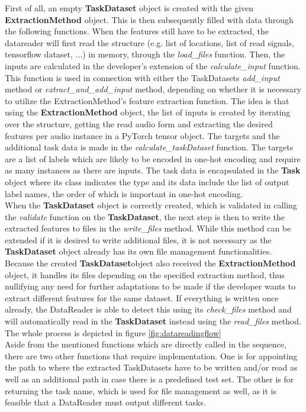 First of all, an empty \textbf{TaskDataset} object is created with the given \textbf{ExtractionMethod} object. This is then subsequently filled with data through the following functions. When the features still have to be extracted, the datareader will first read the structure (e.g. list of locations, list of read signals, tensorflow dataset, ...) in memory, through the \textit{load\_files} function. Then, the inputs are calculated in the developer's extension of the \textit{calculate\_input} function. This function is used in connection with either the TaskDatasets \textit{add\_input} method or \textit{extract\_and\_add\_input} method, depending on whether it is necessary to utilize the ExtractionMethod's feature extraction function. The idea is that using the \textbf{ExtractionMethod} object, the list of inputs is created by iterating over the structure, getting the read audio form and extracting the desired features per audio instance in a PyTorch tensor object. The targets and the additional task data is made in the \textit{calculate\_taskDataset} function. The targets are a list of labels which are likely to be encoded in one-hot encoding and require as many instances as there are inputs. The task data is encapsulated in the \textbf{Task} object where its class indicates the type and its data include the list of output label names, the order of which is important in one-hot encoding.\\

When the \textbf{TaskDataset} object is correctly created, which is validated in calling the \textit{validate} function on the \textbf{TaskDataset}, the next step is then to write the extracted features to files in the \textit{write\_files} method. While this method can be extended if it is desired to write additional files, it is not necessary as the \textbf{TaskDataset} object already has its own file management functionalities. Because the created \textbf{TaskDataset}object also received the \textbf{ExtractionMethod} object, it handles its files depending on the specified extraction method, thus nullifying any need for further adaptations to be made if the developer wants to extract different features for the same dataset. If everything is written once already, the DataReader is able to detect this using its \textit{check\_files} method and will automatically read in the \textbf{TaskDataset} instead using the \textit{read\_files} method. The whole process is depicted in figure \ref{fig:datareadingflow}\\

Aside from the mentioned functions which are directly called in the sequence, there are two other functions that require implementation. One is for appointing the path to where the extracted TaskDatasets have to be written and/or read as well as an additional path in case there is a predefined test set. The other is for returning the task name, which is used for file management as well, as it is feasible that a DataReader must output different tasks. \\
	
